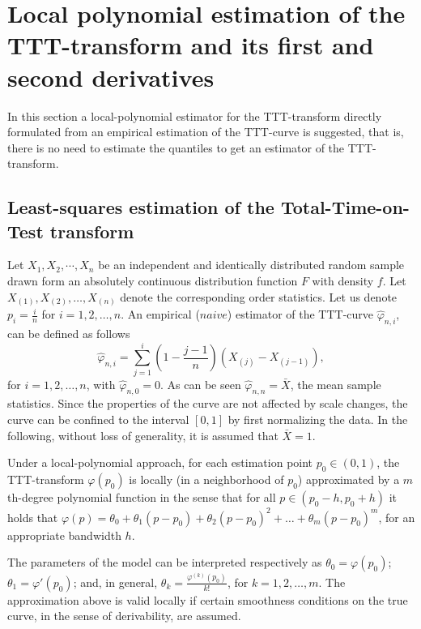 \documentclass[preprint,12pt]{elsarticle}
\begin{document}
%
\section{Local polynomial estimation of the TTT-transform and its first and second derivatives}\label{locpol}
In this section  a local-polynomial estimator for the TTT-transform directly formulated from an empirical estimation of the TTT-curve is suggested, that is, there is no need to estimate the quantiles to get an estimator of the TTT-transform.

%
\subsection{Least-squares estimation of the Total-Time-on-Test transform}

Let $X_1,X_2,\cdots,X_n$ be an independent and identically distributed random sample drawn form an absolutely continuous distribution function $F$ with density $f$. Let $X_{(1)},X_{(2)},\ldots,X_{(n)}$ denote the corresponding order statistics. Let us denote $p_i=\frac{i}{n}$ for $i= 1,2, \ldots, n$. An empirical ($naive$) estimator of the TTT-curve $\widehat{\varphi}_{n,i}$, can be defined as follows
%
\begin{equation}\label{empi}
\widehat{\varphi}_{n,i}= \sum_{j=1}^i \left(1-\frac{j-1}{n}\right) \left(X_{(j)}-X_{(j-1)}\right),
\end{equation}
for $i=1,2,\ldots,n$, with $\widehat{\varphi}_{n,0}=0$. As can be seen $\widehat{\varphi}_{n,n}=\bar{X}$, the mean sample statistics. Since the properties of the curve are not affected by scale changes, the curve can be confined to the interval $[0,1]$ by first normalizing the data. In the following, without loss of generality, it is assumed that $\bar{X}=1$.

Under a local-polynomial approach, for each estimation point $p_0 \in (0,1)$, the TTT-transform $\varphi(p_0)$ is locally (in a neighborhood of $p_0$) approximated by a $m$th-degree polynomial function in the sense that for all $p \in \left(p_0-h,p_0+h\right)$ it holds that $\varphi(p)=\theta_0+\theta_1(p-p_0)+\theta_2(p-p_0)^2+\ldots+\theta_m(p-p_0)^m$, for an appropriate bandwidth $h$. 

The parameters of the model can be interpreted respectively as $\theta_0={\varphi}(p_0)$; ${\theta}_1={\varphi'}(p_0)$; and, in general, ${\theta}_k=\frac{\varphi^{(k)}(p_0)}{k!}$, for $k=1,2,\ldots,m$. The approximation above is valid locally if certain smoothness conditions on the true curve, in the sense of derivability, are assumed. 
\end{document}
